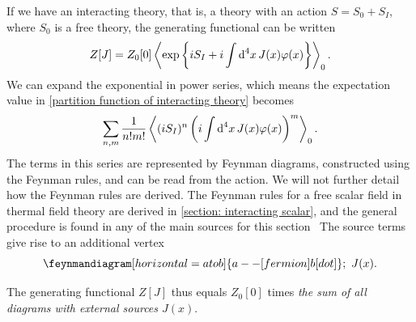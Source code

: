 If we have an interacting theory, that is, a theory with an action $S = S_0 + S_I$, where $S_0$ is a free theory, the generating functional can be written
%
\begin{equation}
    \label{partition function of interacting theory}
    Z[J] 
    = Z_0[0] \left\langle \text{exp} \left\{ iS_I + i\int \text{d}^4 x \, J(x) \varphi(x) \right\} \right\rangle_0.
\end{equation}
%
We can expand the exponential in power series, which means the expectation value in \autoref{partition function of interacting theory} becomes
%
\begin{equation}
    \sum_{n, m} \frac{1}{n! m!} \left\langle (iS_I)^n \left(i\int \text{d}^4 x \, J(x) \varphi(x)\right)^m \right\rangle_0.
\end{equation}
%
The terms in this series are represented by Feynman diagrams, constructed using the Feynman rules, and can be read from the action.
We will not further detail how the Feynman rules are derived.
The Feynman rules for a free scalar field in thermal field theory are derived in \autoref{section: interacting scalar}, and the general procedure is found in any of the main sources for this section~\autocite{peskinIntroductionQuantumField1995,schwartzQuantumFieldTheory2013,weinbergQuantumTheoryFields1995,weinbergQuantumTheoryFields1996}
The source terms give rise to an additional vertex
%
\begin{equation}
    \feynmandiagram [horizontal=a to b]{
        a -- [fermion] b [dot]
    }; \, \, J(x).
\end{equation}

The generating functional $Z[J]$ thus equals $Z_0[0]$ times \emph{the sum of all diagrams with external sources $J(x)$}.

